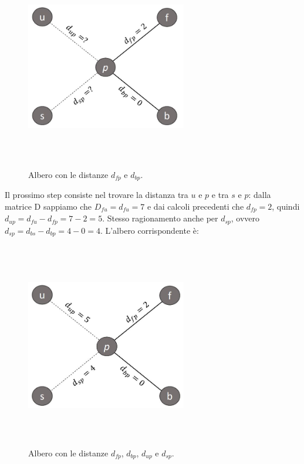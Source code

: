 \begin{figure}[h!]
\centering
	\includegraphics[height=9cm, width=7cm, keepaspectratio]{distance_between_f_b_part_3.jpg}
 	\caption{Albero con le distanze $d_{fp}$ e $d_{bp}$.}
  	\label{fig:neighborsleaves_3}
\end{figure}
\newline
Il prossimo step consiste nel trovare la distanza tra $u$ e $p$ e tra $s$ e $p$: dalla matrice D sappiamo che $D_{fu}=d_{fu}=7$ e dai calcoli precedenti che $d_{fp}=2$, quindi $d_{up}=d_{fu}-d_{fp}=7-2=5$. Stesso ragionamento anche per $d_{sp}$, ovvero $d_{sp}=d_{bs}-d_{bp}=4-0=4$.
\newline
L'albero corrispondente è:
\newpage
\begin{figure}[h!]
\centering
	\includegraphics[height=9cm, width=7cm, keepaspectratio]{distance_between_f_b_part_4.jpg}
 	\caption{Albero con le distanze $d_{fp}$, $d_{bp}$, $d_{up}$ e $d_{sp}$.}
  	\label{fig:neighborsleaves_3}
\end{figure}

